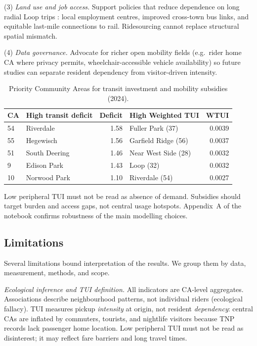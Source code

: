 \documentclass[10pt, a4paper]{article}
\begin{document}
(3) \textit{Land use and job access.} Support policies that reduce dependence on long radial Loop trips \cite{kwan1998}: local employment centres, improved cross-town bus links, and equitable last-mile connections to rail. Ridesourcing cannot replace structural spatial mismatch.

(4) \textit{Data governance.} Advocate for richer open mobility fields (e.g.\ rider home CA where privacy permits, wheelchair-accessible vehicle availability) so future studies can separate resident dependency from visitor-driven intensity.

\begin{table}[htbp]
    \centering
    \caption{Priority Community Areas for transit investment and mobility subsidies (2024).}
    \label{tab:policy}
    \small
    \begin{tabular}{|l|l|r|l|r|}
        \hline
        \textbf{CA} & \textbf{High transit deficit} & \textbf{Deficit} & \textbf{High Weighted TUI} & \textbf{WTUI} \\
        \hline
        54 & Riverdale & 1.58 & Fuller Park (37) & 0.0039 \\
        55 & Hegewisch & 1.56 & Garfield Ridge (56) & 0.0037 \\
        51 & South Deering & 1.46 & Near West Side (28) & 0.0032 \\
        9  & Edison Park & 1.43 & Loop (32) & 0.0032 \\
        10 & Norwood Park & 1.10 & Riverdale (54) & 0.0027 \\
        \hline
    \end{tabular}
\end{table}

Low peripheral TUI must not be read as absence of demand. Subsidies should target burden and access gaps, not central usage hotspots. Appendix~A of the notebook confirms robustness of the main modelling choices.

\subsection{Limitations}\label{sec:limitations}
Several limitations bound interpretation of the results. We group them by data, measurement, methods, and scope.

\textit{Ecological inference and TUI definition.} All indicators are CA-level aggregates. Associations describe neighbourhood patterns, not individual riders (ecological fallacy). TUI measures pickup \emph{intensity} at origin, not resident \emph{dependency}: central CAs are inflated by commuters, tourists, and nightlife visitors because TNP records lack passenger home location. Low peripheral TUI must not be read as disinterest; it may reflect fare barriers and long travel times.
\end{document}
